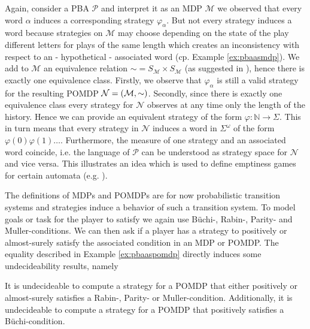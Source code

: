 \begin{example}
  Again, consider a \ac{PBA} $\mathcal{P}$ and interpret it as an \ac{MDP}
  $\mathcal{M}$ we observed that every word $\alpha$ induces a corresponding
  strategy $\varphi_{\alpha}$. But not every strategy induces a word because
  strategies on $\mathcal{M}$ may choose depending on the state of the play
  different letters for plays of the same length which creates an inconsistency
  with respect to an - hypothetical - associated word (cp. Example 
  \ref{ex:pbaasmdp}). We add to $\mathcal{M}$ an equivalence relation
  $\sim = S_{\mathcal{M}} \times S_{\mathcal{M}}$ (as suggested in
  \cite{DecProblemsForProbAuto}), hence there is exactly one equivalence class.
  Firstly, we observe that $\varphi_{\alpha}$ is still a valid strategy for the
  resulting \ac{POMDP} $\mathcal{N} = \left(\mathcal{M}, \sim\right)$. Secondly,
  since there is exactly one equivalence class every strategy for $\mathcal{N}$
  observes at any time only the length of the history. Hence we can provide an
  equivalent strategy of the form $\varphi:\mathbb{N}\rightarrow \Sigma$. This
  in turn means that every strategy in $\mathcal{N}$ induces a word in
  $\Sigma^{\omega}$ of the form $\varphi(0)\varphi(1)\dots$. Furthermore, the
  measure of one strategy and an associated word coincide, i.e. the language of
  $\mathcal{P}$ can be understood as strategy space for $\mathcal{N}$ and vice
  versa. This illustrates an idea which is used to define emptiness games for
  certain automata (e.g. \cite[Proposition 45]{RandAutoInfTrees}).
  \label{ex:pbaaspomdp}
\end{example}
The definitions of \acp{MDP} and \acp{POMDP} are for now probabilistic 
transition systems and strategies induce a behavior of such a transition 
system. To model goals or task for the player to satisfy we again use 
Büchi-, Rabin-, Parity- and Muller-conditions. We can then ask if a player has
a strategy to positively or almost-surely satisfy the associated condition in
an \ac{MDP} or \ac{POMDP}. The equality described in Example 
\ref{ex:pbaaspomdp} directly induces some undecideability results, namely
\begin{theorem}
  \cite[Corollary 3 (a)]{DecProblemsForProbAuto}
  \cite[Theorem 5]{QualAnaPOMDP}
  It is undecideable to compute a strategy for a \ac{POMDP} that either 
  positively or almost-surely satisfies a Rabin-, Parity- or Muller-condition.
  Additionally, it is undecideable to compute a strategy for a \ac{POMDP} that
  positively satisfies a Büchi-condition.
\end{theorem}
